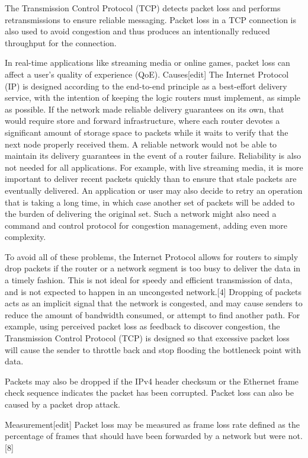 The Transmission Control Protocol (TCP) detects packet loss and performs retransmissions to ensure reliable messaging. Packet loss in a TCP connection is also used to avoid congestion and thus produces an intentionally reduced throughput for the connection.

In real-time applications like streaming media or online games, packet loss can affect a user's quality of experience (QoE).
Causes[edit]
The Internet Protocol (IP) is designed according to the end-to-end principle as a best-effort delivery service, with the intention of keeping the logic routers must implement, as simple as possible. If the network made reliable delivery guarantees on its own, that would require store and forward infrastructure, where each router devotes a significant amount of storage space to packets while it waits to verify that the next node properly received them. A reliable network would not be able to maintain its delivery guarantees in the event of a router failure. Reliability is also not needed for all applications. For example, with live streaming media, it is more important to deliver recent packets quickly than to ensure that stale packets are eventually delivered. An application or user may also decide to retry an operation that is taking a long time, in which case another set of packets will be added to the burden of delivering the original set. Such a network might also need a command and control protocol for congestion management, adding even more complexity.

To avoid all of these problems, the Internet Protocol allows for routers to simply drop packets if the router or a network segment is too busy to deliver the data in a timely fashion. This is not ideal for speedy and efficient transmission of data, and is not expected to happen in an uncongested network.[4] Dropping of packets acts as an implicit signal that the network is congested, and may cause senders to reduce the amount of bandwidth consumed, or attempt to find another path. For example, using perceived packet loss as feedback to discover congestion, the Transmission Control Protocol (TCP) is designed so that excessive packet loss will cause the sender to throttle back and stop flooding the bottleneck point with data.

Packets may also be dropped if the IPv4 header checksum or the Ethernet frame check sequence indicates the packet has been corrupted. Packet loss can also be caused by a packet drop attack.

Measurement[edit]
Packet loss may be measured as frame loss rate defined as the percentage of frames that should have been forwarded by a network but were not.[8]

